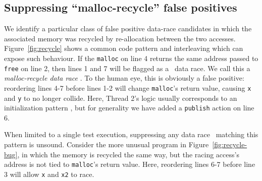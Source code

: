 
\subsection{Suppressing ``malloc-recycle'' false positives}
\label{sec:recycle}

We identify a particular class of false positive data-race candidates in which the associated memory was recycled by re-allocation between the two accesses.
Figure~\ref{fig:recycle} shows a common code pattern and interleaving which can expose such behaviour.
If the {\tt malloc} on line 4 returns the same address passed to {\tt free} on line 2, then lines 1 and 7 will be flagged as a ~data race.
We call this a {\em malloc-recycle data race }.
To the human eye, this is obviously a false positive: reordering lines 4-7 before lines 1-2 will change {\tt malloc}'s return value, causing {\tt x} and {\tt y} to no longer collide.
Here, Thread 2's logic usually corresponds to an initialization pattern \cite{eraser}, but for generality we have added a {\tt publish} action on line 6.


When limited to a single test execution, suppressing any data race ~matching this pattern is unsound.
Consider the more unusual program in Figure~\ref{fig:recycle-bug},
in which the memory is recycled the same way, but the racing access's address is not tied to {\tt malloc}'s return value.
Here, reordering lines 6-7 before line 3 will allow {\tt x} and {\tt x2} to race.

